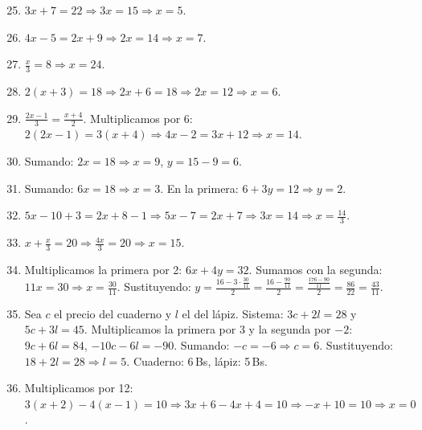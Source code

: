 \documentclass[12pt, a4paper]{article}
\begin{document}
\begin{enumerate}[leftmargin=*, label=\textbf{\arabic*.}]
  \setcounter{enumi}{24}
  \item $3x + 7 = 22 \Rightarrow 3x = 15 \Rightarrow x = 5$.

  \item $4x - 5 = 2x + 9 \Rightarrow 2x = 14 \Rightarrow x = 7$.

  \item $\frac{x}{3} = 8 \Rightarrow x = 24$.

  \item $2(x+3) = 18 \Rightarrow 2x + 6 = 18 \Rightarrow 2x = 12 \Rightarrow x = 6$.

  \item $\frac{2x-1}{3} = \frac{x+4}{2}$. Multiplicamos por 6: $2(2x-1) = 3(x+4) \Rightarrow 4x - 2 = 3x + 12 \Rightarrow x = 14$.

  \item Sumando: $2x = 18 \Rightarrow x = 9$, $y = 15 - 9 = 6$.

  \item Sumando: $6x = 18 \Rightarrow x = 3$. En la primera: $6 + 3y = 12 \Rightarrow y = 2$.

  \item $5x - 10 + 3 = 2x + 8 - 1 \Rightarrow 5x - 7 = 2x + 7 \Rightarrow 3x = 14 \Rightarrow x = \frac{14}{3}$.

  \item $x + \frac{x}{3} = 20 \Rightarrow \frac{4x}{3} = 20 \Rightarrow x = 15$.

  \item Multiplicamos la primera por 2: $6x + 4y = 32$. Sumamos con la segunda: $11x = 30 \Rightarrow x = \frac{30}{11}$. Sustituyendo: $y = \frac{16 - 3 \cdot \frac{30}{11}}{2} = \frac{16 - \frac{90}{11}}{2} = \frac{\frac{176 - 90}{11}}{2} = \frac{86}{22} = \frac{43}{11}$.

  \item Sea $c$ el precio del cuaderno y $l$ el del lápiz. Sistema: $3c + 2l = 28$ y $5c + 3l = 45$. Multiplicamos la primera por 3 y la segunda por $-2$: $9c + 6l = 84$, $-10c - 6l = -90$. Sumando: $-c = -6 \Rightarrow c = 6$. Sustituyendo: $18 + 2l = 28 \Rightarrow l = 5$. Cuaderno: 6\,Bs, lápiz: 5\,Bs.

  \item Multiplicamos por 12: $3(x+2) - 4(x-1) = 10 \Rightarrow 3x + 6 - 4x + 4 = 10 \Rightarrow -x + 10 = 10 \Rightarrow x = 0$.
\end{enumerate}
\end{document}
